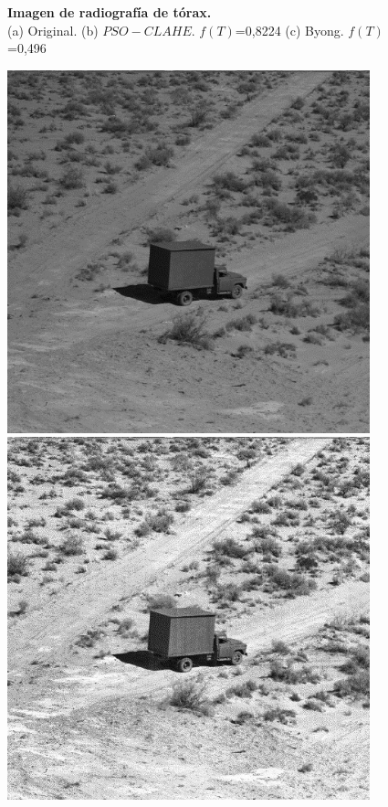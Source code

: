 \documentclass[a0,landscape,spanish]{a0poster}
\begin{document}
\begin{multicols}{3}
\begin{figure}[H]
  \caption{\textbf{Imagen de radiografía de tórax.} \\
(a) Original. (b) $PSO-CLAHE$. $f(T)$=0,8224 (c) Byong. $f(T)$=0,496}
\label{fig:resultado_chest}
\end{figure}

\begin{figure}[H]
\centering
\captionsetup{justification=centering}
 \includegraphics[width=10.5cm]{Camionoriginal.jpg}
 \hspace{0.1pt}
 \includegraphics[width=10.5cm]{Camionclahe.jpg}
 \hspace{0.1pt}

\end{figure}
\end{multicols}
\end{document}
